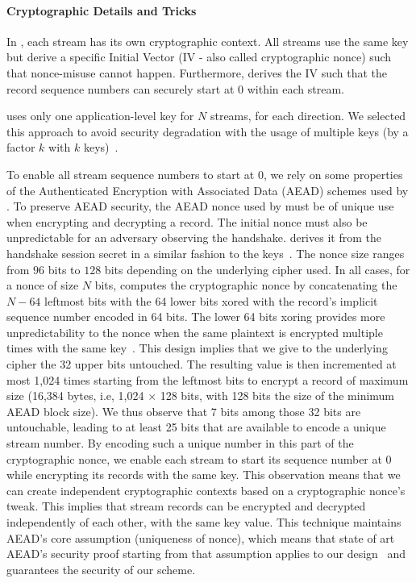 \paragraph*{Cryptographic Details and Tricks} In \tcpls, each stream has its own
cryptographic context. All streams use the same key but derive a specific
Initial Vector (IV - also called cryptographic nonce) such that nonce-misuse
cannot happen. Furthermore, \tcpls derives the IV such that the record sequence
numbers can securely start at $0$ within each stream.

\tcpls uses only one application-level key for $N$ streams, for each direction.
We selected this approach to avoid security degradation with the usage of
multiple keys (by a factor $k$ with $k$ keys)~\cite{chatterjee2011another}.

To enable all stream sequence numbers to start at 0, we rely on some properties
of the Authenticated Encryption with Associated Data (AEAD) schemes used by . To preserve AEAD security, the AEAD nonce used by \tcpls must be of unique
use when encrypting and decrypting a record. The initial nonce must also be
unpredictable for an adversary observing the handshake. \tcpls derives it from
the \tls handshake session secret in a similar fashion to the \tls
keys~\cite{rfc8446}. The nonce size ranges from $96$ bits to $128$ bits
depending on the underlying cipher used. In all cases, for a nonce of size $N$
bits, \tls computes the cryptographic nonce by concatenating the $N-64$ leftmost bits with the 64 lower bits xored with the record's implicit sequence number encoded in 64 bits. The lower 64 bits xoring provides more unpredictability to the nonce when the same plaintext is encrypted multiple times with the same key~\cite{bellare2016multi,hoang2018multi}. This design implies that we give to the underlying cipher the 32 upper bits untouched. The resulting value is then incremented at most 1,024 times starting from the leftmost bits to encrypt a \tls record of maximum size (16,384 bytes,
i.e, 1,024 $\times$ 128 bits, with 128 bits the size of the minimum AEAD block
size). We thus observe that 7 bits among those 32 bits are untouchable, leading
to at least 25 bits that are available to encode a unique stream number. By
encoding such a unique number in this part of the cryptographic nonce, we enable
each stream to start its sequence number at 0 while encrypting its records with
the same key. This observation means that we can create independent
cryptographic contexts based on a cryptographic nonce's tweak. This implies
that stream records can be encrypted and decrypted independently of each other,
with the same key value. This technique maintains AEAD's core assumption
(uniqueness of nonce), which means that state of art AEAD's security proof
starting from that assumption applies to our
design~\cite{chatterjee2011another} and guarantees the security of our scheme.


